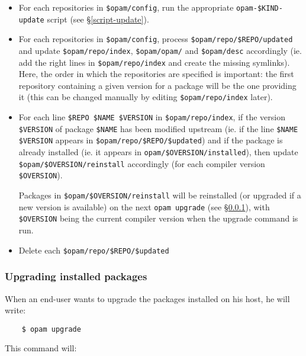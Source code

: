\documentclass[a4paper,11pt]{article}
\begin{document}
\begin{itemize}

\item For each repositories in \verb+$opam/config+, run the
  appropriate \verb+opam-$KIND-update+ script (see
  \S\ref{script-update}).

\item For each repositories in \verb+$opam/config+, process
  \verb+$opam/repo/$REPO/updated+ and update \verb+$opam/repo/index+,
  \verb+$opam/opam/+ and \verb+$opam/desc+ accordingly (ie. add the
  right lines in \verb+$opam/repo/index+ and create the missing
  symlinks). Here, the order in which the repositories are specified
  is important: the first repository containing a given version for a
  package will be the one providing it (this can be changed manually
  by editing \verb+$opam/repo/index+ later).

\item For each line \verb+$REPO $NAME $VERSION+ in
  \verb+$opam/repo/index+, if the version \verb+$VERSION+ of package
  \verb+$NAME+ has been modified upstream (ie. if the line
  \verb+$NAME $VERSION+ appears in \verb+$opam/repo/$REPO/$updated+)
  and if the package is already installed (ie. it appears in
  \verb+opam/$OVERSION/installed+), then update
  \verb+$opam/$OVERSION/reinstall+ accordingly (for each compiler
  version \verb+$OVERSION+).

  Packages in \verb+$opam/$OVERSION/reinstall+ will be reinstalled (or
  upgraded if a new version is available) on the next {\tt opam
    upgrade} (see \S\ref{opam-upgrade}), with \verb+$OVERSION+ being
  the current compiler version when the upgrade command is run.

\item Delete each \verb+$opam/repo/$REPO/$updated+

\end{itemize}

\subsubsection{Upgrading installed packages}
\label{opam-upgrade}

When an end-user wants to upgrade the packages installed on his host,
he will write:

\begin{verbatim}
    $ opam upgrade
\end{verbatim}

This command will:
\end{document}
